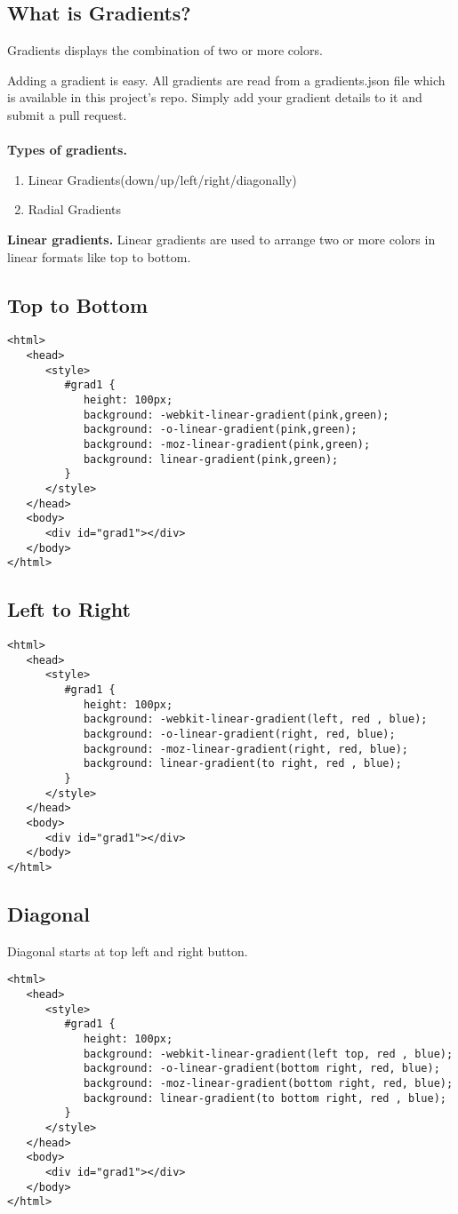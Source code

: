 \documentclass[a4paper,oneside]{book}
\numberwithin{equation}{chapter}
\begin{document}
\subsection{What is Gradients?}
Gradients displays the combination of two or more colors.

 Adding a gradient is easy. All gradients are read from a gradients.json file which is available in this project's repo. Simply add your gradient details to it and submit a pull request.\\
\\
\textbf{Types of gradients.}
\begin{enumerate}
\item Linear Gradients(down/up/left/right/diagonally)
\item Radial Gradients
\end{enumerate}
\textbf{Linear gradients.} Linear gradients are used to arrange two or more colors in linear formats like top to bottom.
\subsection{Top to Bottom}
\begin{verbatim}
<html>
   <head>
      <style>
         #grad1 {
            height: 100px;
            background: -webkit-linear-gradient(pink,green);
            background: -o-linear-gradient(pink,green);
            background: -moz-linear-gradient(pink,green); 
            background: linear-gradient(pink,green); 
         }
      </style>
   </head>
   <body>
      <div id="grad1"></div>
   </body>
</html> 
\end{verbatim}
\subsection{Left to Right}
\begin{verbatim}
<html>
   <head>
      <style>
         #grad1 {
            height: 100px;
            background: -webkit-linear-gradient(left, red , blue);
            background: -o-linear-gradient(right, red, blue); 
            background: -moz-linear-gradient(right, red, blue);
            background: linear-gradient(to right, red , blue);
         }
      </style>
   </head>
   <body>
      <div id="grad1"></div>
   </body>
</html> 
\end{verbatim}
\subsection{Diagonal}
Diagonal starts at top left and right button.
\begin{verbatim}
<html>
   <head>
      <style>
         #grad1 {
            height: 100px;
            background: -webkit-linear-gradient(left top, red , blue); 
            background: -o-linear-gradient(bottom right, red, blue); 
            background: -moz-linear-gradient(bottom right, red, blue);
            background: linear-gradient(to bottom right, red , blue); 
         }
      </style>
   </head>
   <body>
      <div id="grad1"></div>
   </body>
</html> 
\end{verbatim}
\end{document}
